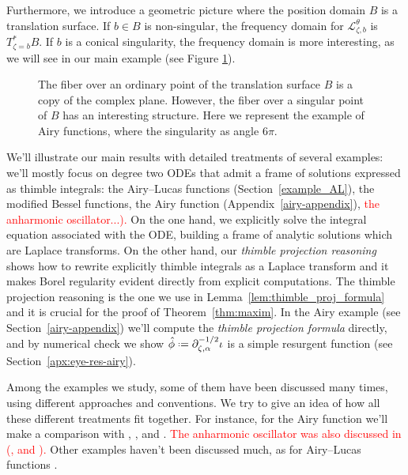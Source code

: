 \documentclass{article}
\newcommand{\fracderiv}[3]{\partial^{#1}_{#2, #3}}
\newcommand*{\defeq}{\mathrel{\vcenter{\baselineskip0.5ex \lineskiplimit0pt
                     \hbox{\scriptsize.}\hbox{\scriptsize.}}}%
                     =}
\newcommand{\laplace}{\mathcal{L}}
\theoremstyle{definition}
\theoremstyle{plain}
\begin{document}
Furthermore, we introduce a geometric picture where the position domain $B$ is a translation surface. If $b \in B$ is non-singular, the frequency domain for $\laplace_{\zeta,b}^\theta$ is $T^*_{\zeta=b} B$. If $b$ is a conical singularity, the frequency domain is more interesting, as we will see in our main example (see Figure \ref{fig:different_fibres}). 
\begin{figure}[ht]
\centering
\basicLaplace
\vspace{1cm}

\phaseSpaceLaplace
\caption{The fiber over an ordinary point of the translation surface $B$ is a copy of the complex plane. However, the fiber over a singular point of $B$ has an interesting structure. Here we represent the example of Airy functions, where the singularity as angle $6 \pi$.}
    \label{fig:different_fibres}
\end{figure}

We’ll illustrate our main results with detailed treatments of several examples: we’ll mostly focus on degree two ODEs that admit a frame of solutions expressed as thimble integrals: the Airy--Lucas functions (Section~\ref{example_AL}), the modified Bessel functions, the Airy function (Appendix~\ref{airy-appendix}), \textcolor{red}{the anharmonic oscillator...).} On the one hand, we explicitly solve the integral equation associated with the ODE, building a frame of analytic solutions which are Laplace transforms. On the other hand, our \textit{thimble projection reasoning} shows how to rewrite explicitly thimble integrals as a Laplace transform and it makes Borel regularity evident directly from explicit computations. The thimble projection reasoning is the one we use in Lemma~\ref{lem:thimble_proj_formula} and it is crucial for the proof of Theorem~\ref{thm:maxim}. In the Airy example (see Section~\ref{airy-appendix}) we’ll compute the \textit{thimble projection formula} directly, and by numerical check we show $\hat{\phi}\defeq\fracderiv{-1/2}{\zeta}{\alpha}\iota$ is a simple resurgent function (see Section~\ref{apx:eye-res-airy}).

Among the examples we study, some of them have been discussed many times, using different approaches and conventions. We try to give an idea of how all these different treatments fit together. For instance, for the Airy function we’ll make a comparison with \cite[Section 2.2]{lectures-Marino}, \cite[Section 6.14]{diverg-resurg-i}, and \cite[Section 2.2]{kawai-takei}. \textcolor{red}{The anharmonic oscillator was also discussed in (\cite{bender-wu}, \cite[Appendix B]{aniceto2019primer} and \cite[Section 2.5.3]{sternin1995borel}).} Other examples haven't been discussed much, as for Airy--Lucas functions \cite[Equation 3.2]{charbonnier22}. 
\end{document}
